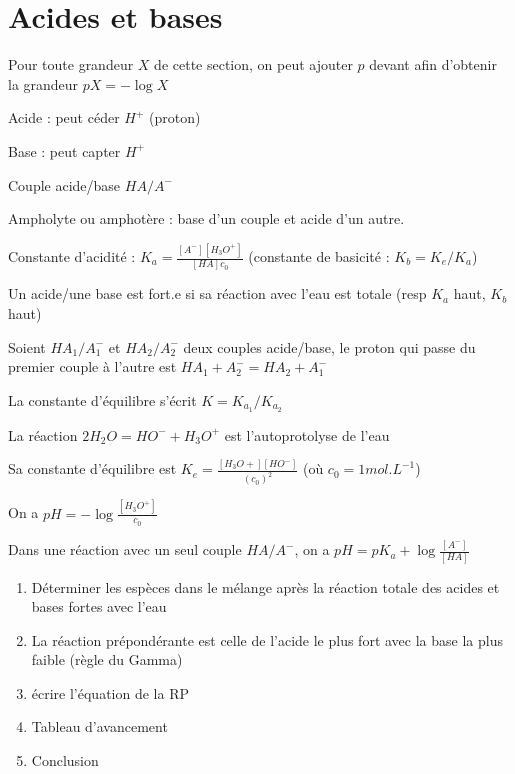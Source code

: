 \documentclass[a4paper,12pt]{book}
\newcommand{\Def}[2]{\begin{tcolorbox}[colback=white,colframe=red!10!green!20!blue!75!, title=Définition : #1]#2\end{tcolorbox}}
\newcommand{\Thr}[2]{\begin{tcolorbox}[sharp corners, colback=white,colframe=red!10!blue!30!green!75!, title=Théorème : #1]#2\end{tcolorbox}}
\newcommand{\Meth}[2]{\begin{tcolorbox}[colback=white,colframe=green!60!green!30!black!75, title=Méthode :  #1]#2\end{tcolorbox}}
\begin{document}
\section{Acides et bases}
Pour toute grandeur $X$ de cette section, on peut ajouter $p$ devant afin d'obtenir la grandeur $pX =-\log X$
\Def{}{Acide : peut céder $H^+$ (proton)
\par Base : peut capter $H^+$
\par Couple acide/base $HA/A^-$
\par Ampholyte ou amphotère : base d'un couple et acide d'un autre.
\par Constante d'acidité : $K_a = \frac{[A^-][H_3O^+]}{[HA]c_0}$ (constante de basicité : $K_b = K_e/K_a$)
\par Un acide/une base est fort.e si sa réaction avec l'eau est totale (resp $K_a$ haut, $K_b$ haut)}
\Def{Réaction}{Soient $HA_1/ A_1^-$ et $HA_2/A_2^-$ deux couples acide/base, le proton qui passe du premier couple à l'autre est $HA_1+A_2^-=HA_2+A_1^-$
\par La constante d'équilibre s'écrit $K = K_{a_1}/K_{a_2}$
}
\Thr{Autoprotolyse}{La réaction $2H_2O=HO^-+H_3O^+$ est l'autoprotolyse de l'eau
\par Sa constante d'équilibre est $K_e=\frac{[H_3O+][HO^-]}{(c_0)^2}$ (où $c_0 = 1 mol.L^{-1}$)
\par On a $pH = -\log\frac{[H_3O^+]}{c_0}$
\par Dans une réaction avec un seul couple $HA/A^-$, on a $pH =pK_a + \log\frac{[A^-]}{[HA]}$ 
}
\Meth{Déterminer la réaction prépondérante}{\begin{enumerate}
\item Déterminer les espèces dans le mélange après la réaction totale des acides et bases fortes avec l'eau
\item La réaction prépondérante est celle de l'acide le plus fort avec la base la plus faible (règle du Gamma)
\item écrire l'équation de la RP
\item Tableau d'avancement
\item Conclusion
\end{enumerate}}
\end{document}

